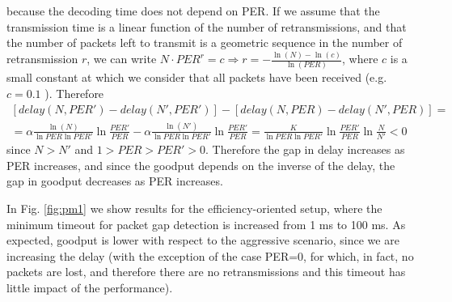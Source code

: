 because the decoding time does not depend on PER. If we assume that the transmission time is a linear function of the number of retransmissions, and that the number of packets left to transmit is a geometric sequence in the number of retransmission $r$, we can write $N\cdot PER^r=c \Rightarrow r=-\frac{\ln(N)-\ln(c)}{\ln(PER)}$, where $c$ is a small constant at which we consider that all packets have been received (e.g. $c=0.1$ ). Therefore
\begin{equation*}
\begin{split}
[delay(N,PER')-delay(N',PER')]-[delay(N,PER)-delay(N',PER)]=\\ 
=\alpha\frac{\ln(N)}{\ln PER \ln PER'}\ln{\frac{PER'}{PER}}-\alpha\frac{\ln(N')}{\ln PER \ln PER'}\ln{\frac{PER'}{PER}}=\frac{K}{\ln PER \ln PER'}\ln{\frac{PER'}{PER}}\ln{\frac{N}{N'}}<0
\end{split}
\end{equation*}
since $N>N'$ and $1>PER>PER'>0$. Therefore the gap in delay increases as PER increases, and since the goodput depends on the inverse of the delay, the gap in goodput decreases as PER increases.

In Fig. \ref{fig:pm1} we show results for the efficiency-oriented setup, where the minimum timeout for packet gap detection is increased from 1 ms to 100 ms. As expected, goodput is lower with respect to the aggressive scenario, since we are increasing the delay (with the exception of the case PER=0, for which, in fact, no packets are lost, and therefore there are no retransmissions and this timeout has little impact of the performance).

